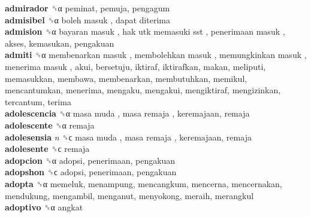 \textbf{admirador} ␝α  peminat, pemuja, pengagum  \\
\textbf{admisibel} ␝α   boleh masuk ,  dapat diterima   \\
\textbf{admision} ␝α   bayaran masuk ,  hak utk memasuki sst ,  penerimaan masuk , akses, kemasukan, pengakuan  \\
\textbf{admiti} ␝α   membenarkan masuk ,  membolehkan masuk ,  memungkinkan masuk ,  menerima masuk , akui, bersetuju, iktiraf, iktirafkan, makan, meliputi, memasukkan, membawa, membenarkan, membutuhkan, memikul, mencantumkan, menerima, mengaku, mengakui, mengiktiraf, mengizinkan, tercantum, terima  \\
\textbf{adolescencia} ␝α   masa muda ,  masa remaja , keremajaan, remaja  \\
\textbf{adolescente} ␝α  remaja  \\
\textbf{adolesensia} \emph{n}  ␝ϲ   masa muda ,  masa remaja , keremajaan, remaja  \\
\textbf{adolesente} ␝ϲ  remaja  \\
\textbf{adopcion} ␝α  adopsi, penerimaan, pengakuan  \\
\textbf{adopshon} ␝ϲ  adopsi, penerimaan, pengakuan  \\
\textbf{adopta} ␝α  memeluk, menampung, mencangkum, mencerna, mencernakan, mendukung, mengambil, menganut, menyokong, meraih, merangkul  \\
\textbf{adoptivo} ␝α  angkat  \\

